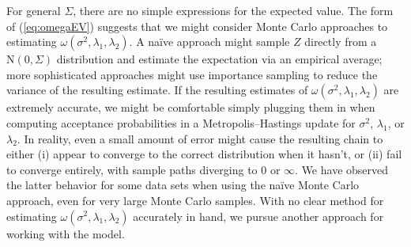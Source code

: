 \documentclass[12pt]{article}
\begin{document}
For general $\Sigma$, there are no simple expressions for the expected value. The form of
(\ref{eq:omegaEV}) suggests that we might consider Monte Carlo approaches to estimating
$\omega(\sigma^2, \lambda_1, \lambda_2)$. A na\"ive approach might sample $Z$ directly
from a $\mbox{N}(0, \Sigma)$ distribution and estimate the expectation via an empirical
average; more sophisticated approaches might use importance sampling to reduce the
variance of the resulting estimate. %
If the resulting estimates of $\omega(\sigma^2, \lambda_1, \lambda_2)$
are extremely accurate, we might be comfortable simply plugging them in when computing
acceptance probabilities in a Metropolis--Hastings update for $\sigma^2$, $\lambda_1$,
or $\lambda_2$. In reality, even a small amount of error might cause the
resulting chain to either (i) appear to converge to the correct distribution when it
hasn't, or (ii) fail to converge entirely, with sample paths diverging to $0$ or $\infty$.
We have observed the latter behavior for some data sets when using the na\"ive Monte
Carlo approach, even for very large Monte Carlo samples. With no clear method for 
estimating $\omega(\sigma^2, \lambda_1, \lambda_2)$
accurately in hand, we pursue another approach for working with the model.
\end{document}
